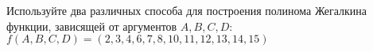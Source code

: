 \question Используйте два различных способа для построения полинома Жегалкина функции, зависящей от аргументов $A, B, C, D$:
$f(A,B,C,D) = (2,3,4,6,7,8,10,11,12,13,14,15)$